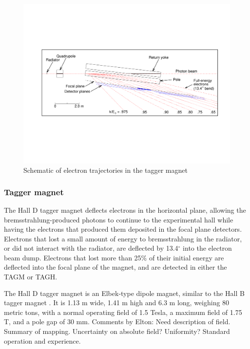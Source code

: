 \begin{figure}[tbp]
\begin{center}
   \includegraphics[width=0.95\linewidth,viewport=80 200 750 400]{figures/BEAM_taggerplot.pdf}
\caption{Schematic of electron trajectories in the tagger magnet 
       \label{fig:beam:BEAM_taggerplot}  }
\end{center}
\end{figure}


\subsubsection{Tagger magnet \label{sec:tagMagnet}}
The Hall D tagger magnet deflects electrons in the horizontal plane, allowing the bremsstrahlung-produced photons to continue to the experimental hall while having the electrons that produced them deposited in the focal plane detectors.
Electrons that lost a small amount of energy to bremsstrahlung in the
radiator, or did not interact with the radiator, are deflected by 13.4$^\circ$ into the electron beam dump.
Electrons that lost more than 25\% of their initial energy are deflected into the focal plane of the magnet, and are detected in either the TAGM or TAGH.

The Hall D tagger magnet is an Elbek-type dipole magnet, similar to the Hall B tagger magnet \cite{BORGGREEN19631, Sober2000263}.
It is 1.13 m wide, 1.41 m high and 6.3 m long, weighing 80 metric tons, with a normal operating field of 1.5 Tesla, a maximum field of 1.75 T, and a pole gap of 30 mm.
{\color{red} Comments by Elton: Need description of field. Summary of mapping. Uncertainty on absolute field? Uniformity? Standard operation and experience.}



